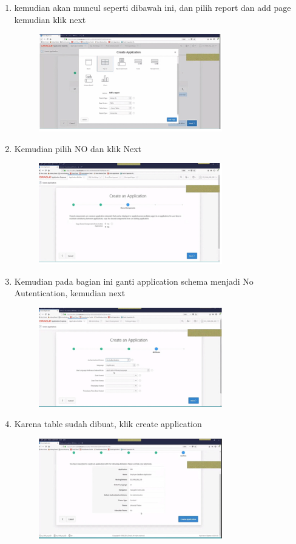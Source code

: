 \documentclass{article}
\begin{document}
\begin{enumerate}
\begin{enumerate}
\begin{enumerate}
\begin{enumerate}
\begin{figure}[h]
            \end{figure}
    \newpage \item kemudian akan muncul seperti dibawah ini, dan pilih report dan add page kemudian  klik next
\begin{figure}[h]
            \centerline{\includegraphics[width=8cm]{image/i.PNG}}
            \end{figure}
    \item Kemudian pilih NO dan klik Next
    \begin{figure}[h]
    \centerline{\includegraphics[width=8cm]{image/j.PNG}}
            \end{figure}
    \item Kemudian pada bagian ini ganti application schema menjadi No Autentication, kemudian next
    \begin{figure}[h]
        \newpage\centerline{\includegraphics[width=8cm]{image/k.PNG}}
    \end{figure}
    \newpage \item Karena  table sudah  dibuat, klik create application
    \begin{figure}[h]
        \newpage\centerline{\includegraphics[width=8cm]{image/l.PNG}}

\end{figure}
\end{enumerate}
\end{enumerate}
\end{enumerate}
\end{enumerate}
\end{document}
